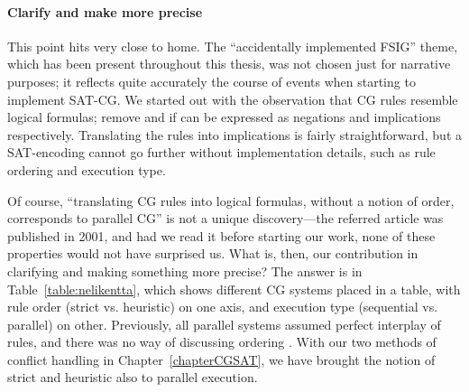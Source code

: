 \paragraph{Clarify and make more precise} This point hits very close to home.
The ``accidentally implemented FSIG'' theme, which has been present throughout this thesis, was not chosen just for narrative purposes; it reflects quite accurately the course of events when starting to implement SAT-CG.
We started out with the observation that CG rules resemble logical formulas; {\sc remove} and {\sc if } can be expressed as negations and implications respectively. 
Translating the rules into implications is fairly straightforward, but a SAT-encoding cannot go further without implementation details, such as rule ordering and execution type. 

Of course, ``translating CG rules into logical formulas, without a notion of order, corresponds to parallel CG'' is not a unique discovery---the referred article was published in 2001, and had we read it before starting our work, none of these properties would not have surprised us.
What is, then, our contribution in clarifying and making something more precise?
The answer is in Table~\ref{table:nelikentta}, which shows different CG systems 
placed in a table, with rule order (strict vs. heuristic) on one axis, 
and execution type (sequential vs. parallel) on other.
Previously, all parallel systems assumed perfect interplay of rules, 
and there was no way of discussing ordering . 
With our two methods of conflict handling in Chapter~\ref{chapterCGSAT}, 
we have brought the notion of strict and heuristic also to parallel execution. 

\def\satcgMax{SAT-CG\textsubscript{Max}}
\def\satcgOrd{SAT-CG\textsubscript{Ord}}


